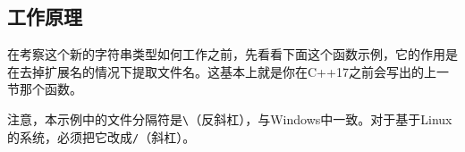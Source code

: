 
\subsection{工作原理}



在考察这个新的字符串类型如何工作之前，先看看下面这个函数示例，它的作用是在去掉扩展名的情况下提取文件名。这基本上就是你在C++17之前会写出的上一节那个函数。



\begin{myNote}
注意，本示例中的文件分隔符是\texttt{\textbackslash{}}（反斜杠），与Windows中一致。对于基于Linux的系统，必须把它改成\texttt{/}（斜杠）。
\end{myNote}



